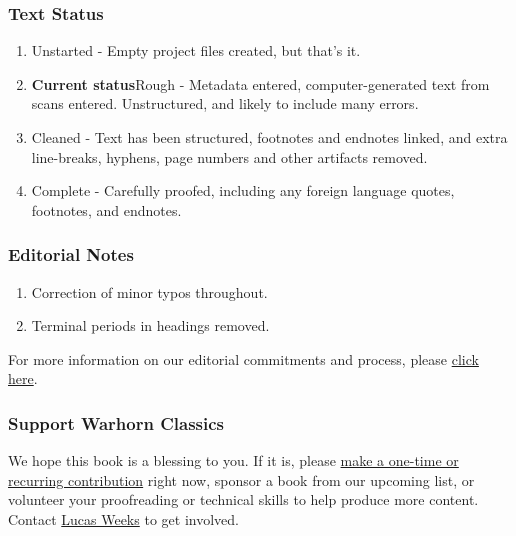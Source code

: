 \documentclass[
]{book}
\providecommand{\tightlist}{%
  \setlength{\itemsep}{0pt}\setlength{\parskip}{0pt}}
\begin{document}
\hypertarget{text-status}{%
\subsubsection*{Text Status}\label{text-status}}

\begin{enumerate}
\def\labelenumi{\arabic{enumi}.}
\setcounter{enumi}{-1}
\tightlist
\item
  Unstarted - Empty project files created, but that's it.
\item
  \textbf{Current status}Rough - Metadata entered, computer-generated text from scans entered. Unstructured, and likely to include many errors.
\item
  Cleaned - Text has been structured, footnotes and endnotes linked, and extra line-breaks, hyphens, page numbers and other artifacts removed.
\item
  Complete - Carefully proofed, including any foreign language quotes, footnotes, and endnotes.
\end{enumerate}

\hypertarget{editorial-notes}{%
\subsubsection*{Editorial Notes}\label{editorial-notes}}

\begin{enumerate}
\def\labelenumi{\arabic{enumi}.}
\tightlist
\item
  Correction of minor typos throughout.
\item
  Terminal periods in headings removed.
\end{enumerate}

For more information on our editorial commitments and process, please \href{https://classics.warhornmedia.com/editorial}{click here}.

\hypertarget{support-warhorn-classics}{%
\subsubsection*{Support Warhorn Classics}\label{support-warhorn-classics}}

We hope this book is a blessing to you. If it is, please \href{https://warhornmedia.com/give}{make a one-time or recurring contribution} right now, sponsor a book from our upcoming list, or volunteer your proofreading or technical skills to help produce more content. Contact \href{mailto:lucas@beggarsborn.com}{Lucas Weeks} to get involved.
\end{document}
